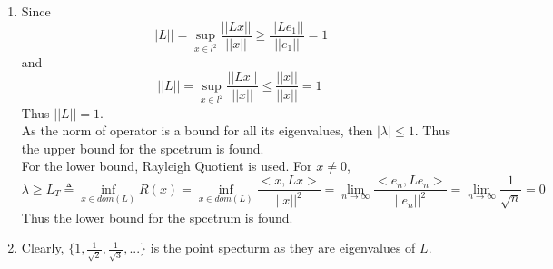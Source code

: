 \documentclass[paper=a4, fontsize=11pt]{scrartcl} %
\numberwithin{equation}{section} %
\numberwithin{figure}{section} %
\numberwithin{table}{section} %
\begin{document}
\begin{enumerate}
\begin{proof}
\begin{equation}
					\lim\limits_{n \rightarrow \infty} ||L_n - L|| = 0
				\end{equation}
				To show this, expand the operator norm as
				\begin{equation}
					\begin{aligned}
						||L_n - L||& = \sup\limits_{x\in l^2}\frac{||(L_n - L)x||}{||x||}\\
						& = \sup\limits_{x\in l^2}\frac{||(0, ... , 0, \frac{x_{n+1}}{\sqrt{n+1}}, \frac{x_{n+2}}{\sqrt{n+2}},...)||}{||x||}\\
						& \leq \frac{1}{\sqrt{n+1}} \frac{||(0, ... , 0, x_{n+1}, x_{n+2}, ...)||}{||x||}\\
						& \leq  \frac{1}{\sqrt{n+1}}
					\end{aligned}
				\end{equation}
				So, $\lim\limits_{n \rightarrow \infty} ||L_n - L|| \leq  \lim\limits_{n \rightarrow \infty} \frac{1}{\sqrt{n+1}} = 0$.\\
				According to the positivity of norm,  $\lim\limits_{n \rightarrow \infty} ||L_n - L||\geq 0$.\\
				Hence  $\lim\limits_{n \rightarrow \infty} ||L_n - L|| = 0$.
			\end{proof}
		\item
			Since
			\begin{equation}
				||L|| = \sup\limits_{x\in l^2} \frac{||Lx||}{||x||} \geq \frac{||Le_1||}{||e_1||} = 1
			\end{equation}
			and
			\begin{equation}
				||L|| = \sup\limits_{x\in l^2} \frac{||Lx||}{||x||} \leq \frac{||x||}{||x||} = 1
			\end{equation}
			Thus $||L|| = 1$.\\
			As the norm of operator is a bound for all its eigenvalues, then $|\lambda| \leq 1$. Thus the upper bound for the spcetrum is found.\\
			For the lower bound, Rayleigh Quotient is used. For $x\neq 0$, 
			\begin{equation}
				\lambda \geq L_T \triangleq \inf\limits_{x\in dom(L)} R(x) = \inf\limits_{x\in dom(L)} \frac{<x, Lx>}{||x||^2} = \lim\limits_{n \rightarrow \infty} \frac{<e_n, Le_n>}{||e_n||^2} = \lim\limits_{n \rightarrow \infty} \frac{1}{\sqrt{n}} = 0
			\end{equation}
			Thus the lower bound for the spcetrum is found.
		\item 
			Clearly, $\{1, \frac{1}{\sqrt{2}}, \frac{1}{\sqrt{3}}, ...\}$ is the point specturm as they are eigenvalues of $L$.

	\end{enumerate}
\end{document}
